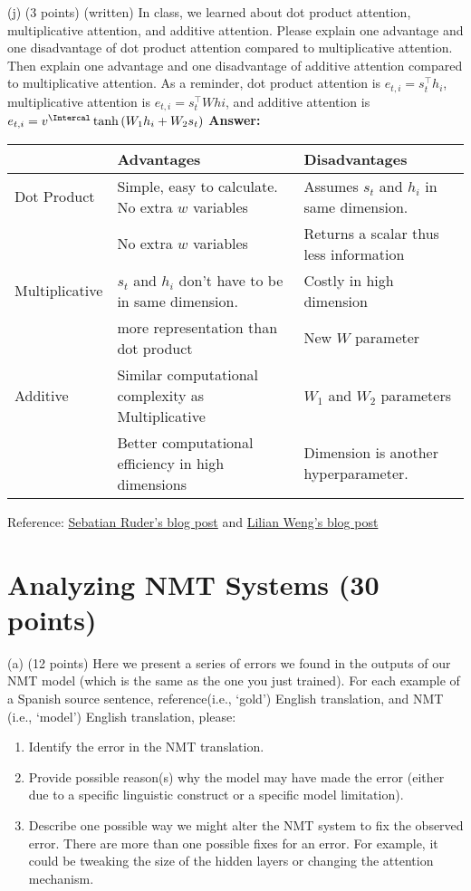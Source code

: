 \documentclass{article}
\begin{document}
\bigbreak
(j) (3 points)  (written) In class, we learned about dot product attention, multiplicative attention, and additive attention.  Please explain one advantage and one disadvantage of dot product attention compared to multiplicative attention.  Then explain one advantage and one disadvantage of additive attention compared to multiplicative attention.  As a reminder, dot product attention is $e_{t,i}=s_t^\intercal h_i$, multiplicative attention is $e_{t,i}=s_t^\intercal W hi$, and additive attention is $e_{t,i}=v^{\Intercal}\tanh{(W_1h_i+W_2s_t)}$
\smallbreak
\textbf{Answer:}
\begin{center}
\begin{tabular}{ |l|l|l| } 
 \hline
  & \textbf{Advantages} & \textbf{Disadvantages} \\ 
 \hline
 Dot Product & Simple, easy to calculate. No extra $w$ variables & Assumes $s_t$ and $h_i$ in same dimension. \\ 
  & No extra $w$ variables & Returns a scalar thus less information  \\ 
 \hline
 Multiplicative & $s_t$ and $h_i$ don't have to be in same dimension. & Costly in high dimension \\
  & more representation than dot product & New $W$ parameter \\ 
 \hline
 Additive & Similar computational complexity as Multiplicative & $W_1$ and $W_2$ parameters \\ 
  & Better computational efficiency in high dimensions & Dimension is another hyperparameter. \\ 
\hline
\end{tabular}
\end{center}
Reference: \href{https://ruder.io/deep-learning-nlp-best-practices/index.html#attention}{Sebatian Ruder's blog post} and \href{https://lilianweng.github.io/lil-log/2018/06/24/attention-attention.html#a-family-of-attention-mechanisms}{Lilian Weng's blog post}
\bigbreak


\section{Analyzing NMT Systems (30 points)}

(a) (12 points)  Here we present a series of errors we found in the outputs of our NMT model (which is the same as the one you just trained).  For each example of a Spanish source sentence, reference(i.e., ‘gold’) English translation, and NMT (i.e., ‘model’) English translation, please:
    \begin{enumerate}
        \item Identify the error in the NMT translation.
        \item Provide possible reason(s) why the model may have made the error (either due to a specific linguistic construct or a specific model limitation).
        \item Describe one possible way we might alter the NMT system to fix the observed error.  There are more than one possible fixes for an error.  For example, it could be tweaking the size of the hidden layers or changing the attention mechanism. 
    \end{enumerate}
\end{document}
